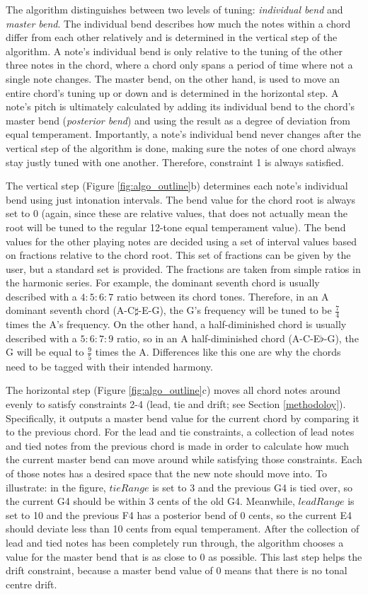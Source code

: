 \documentclass[a4paper]{article}
\begin{document}
The algorithm distinguishes between two levels of tuning: \textit{individual bend} and \textit{master bend}. The individual bend describes how much the notes within a chord differ from each other relatively and is determined in the vertical step of the algorithm. A note's individual bend is only relative to the tuning of the other three notes in the chord, where a chord only spans a period of time where not a single note changes. The master bend, on the other hand, is used to move an entire chord's tuning up or down and is determined in the horizontal step. A note's pitch is ultimately calculated by adding its individual bend to the chord's master bend (\textit{posterior bend}) and using the result as a degree of deviation from equal temperament. Importantly, a note's individual bend never changes after the vertical step of the algorithm is done, making sure the notes of one chord always stay justly tuned with one another. Therefore, constraint 1 is always satisfied.

The vertical step (Figure \ref{fig:algo_outline}b) determines each note's individual bend using just intonation intervals. The bend value for the chord root is always set to 0 (again, since these are relative values, that does not actually mean the root will be tuned to the regular 12-tone equal temperament value). The bend values for the other playing notes are decided using a set of interval values based on fractions relative to the chord root. This set of fractions can be given by the user, but a standard set is provided. The fractions are taken from simple ratios in the harmonic series. For example, the dominant seventh chord is usually described with a $4:5:6:7$ ratio between its chord tones. Therefore, in an A dominant seventh chord (A-C$\sharp$-E-G), the G's frequency will be tuned to be $\frac74$ times the A's frequency. On the other hand, a half-diminished chord is usually described with a $5:6:7:9$ ratio, so in an A half-diminished chord (A-C-E$\flat$-G), the G will be equal to $\frac95$ times the A. Differences like this one are why the chords need to be tagged with their intended harmony.

The horizontal step (Figure \ref{fig:algo_outline}c) moves all chord notes around evenly to satisfy constraints 2-4 (lead, tie and drift; see Section \ref{methodoloy}). Specifically, it outputs a master bend value for the current chord by comparing it to the previous chord. For the lead and tie constraints, a collection of lead notes and tied notes from the previous chord is made in order to calculate how much the current master bend can move around while satisfying those constraints. Each of those notes has a desired space that the new note should move into. To illustrate: in the figure, $\mathit{tieRange}$ is set to 3 and the previous G4 is tied over, so the current G4 should be within 3 cents of the old G4. Meanwhile, $\mathit{leadRange}$ is set to 10 and the previous F4 has a posterior bend of 0 cents, so the current E4 should deviate less than 10 cents from equal temperament. After the collection of lead and tied notes has been completely run through, the algorithm chooses a value for the master bend that is as close to 0 as possible. This last step helps the drift constraint, because a master bend value of 0 means that there is no tonal centre drift.
\end{document}
